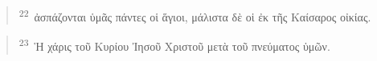 \documentclass{article}
\newcommand{\currentverse}{1} %
\newcommand{\setcurrentverse}[1]{\renewcommand{\currentverse}{#1}}
\begin{document}
\begin{verse}

\setcurrentverse{22}

\setcounter{footnote}{0}

\textsuperscript{22}~ἀσπάζονται ὑμᾶς πάντες οἱ ἅγιοι, μάλιστα δὲ οἱ ἐκ τῆς Καίσαρος οἰκίας.

\end{verse}

\begin{verse}

\setcurrentverse{23}

\setcounter{footnote}{0}

\textsuperscript{23}~Ἡ χάρις τοῦ Κυρίου Ἰησοῦ Χριστοῦ μετὰ τοῦ πνεύματος ὑμῶν.

\end{verse}
\end{document}
